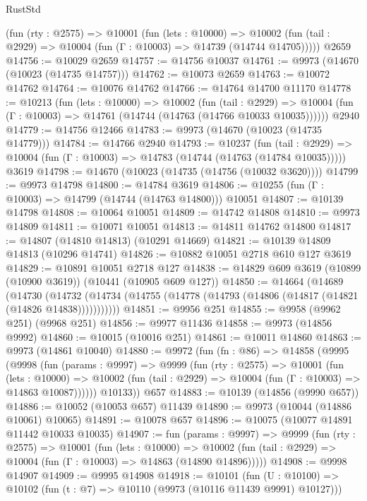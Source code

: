 \begin{lexlean}{RustStd}
\begin{coremodule}
    (fun (rty : @2575) =>
    @10001
      (fun (lets : @10000) =>
      @10002 (fun (tail : @2929) => @10004 (fun (Γ : @10003) => @14739 (@14744 @14705)))))
    @2659
@14756 := @10029 @2659
@14757 := @14756 @10037
@14761 := @9973 (@14670 (@10023 (@14735 @14757)))
@14762 := @10073 @2659
@14763 := @10072 @14762
@14764 := @10076 @14762
@14766 := @14764 @14700 @11170
@14778 := @10213
    (fun (lets : @10000) =>
    @10002
      (fun (tail : @2929) =>
      @10004 (fun (Γ : @10003) => @14761 (@14744 (@14763 (@14766 @10033 @10035))))))
    @2940
@14779 := @14756 @12466
@14783 := @9973 (@14670 (@10023 (@14735 @14779)))
@14784 := @14766 @2940
@14793 := @10237
    (fun (tail : @2929) => @10004 (fun (Γ : @10003) => @14783 (@14744 (@14763 (@14784 @10035)))))
    @3619
@14798 := @14670 (@10023 (@14735 (@14756 (@10032 @3620))))
@14799 := @9973 @14798
@14800 := @14784 @3619
@14806 := @10255 (fun (Γ : @10003) => @14799 (@14744 (@14763 @14800))) @10051
@14807 := @10139 @14798
@14808 := @10064 @10051
@14809 := @14742 @14808
@14810 := @9973 @14809
@14811 := @10071 @10051
@14813 := @14811 @14762 @14800
@14817 := @14807 (@14810 @14813) (@10291 @14669)
@14821 := @10139 @14809 @14813 (@10296 @14741)
@14826 := @10882 @10051 @2718 @610 @127 @3619
@14829 := @10891 @10051 @2718 @127
@14838 := @14829 @609 @3619 (@10899 (@10900 @3619)) (@10441 (@10905 @609 @127))
@14850 := @14664
    (@14689
      (@14730
        (@14732 (@14734 (@14755 (@14778 (@14793 (@14806 (@14817 (@14821 (@14826 @14838)))))))))))
@14851 := @9956 @251
@14855 := @9958 (@9962 @251) (@9968 @251)
@14856 := @9977 @11436
@14858 := @9973 (@14856 @9992)
@14860 := @10015 (@10016 @251)
@14861 := @10011 @14860
@14863 := @9973 (@14861 @10040)
@14880 := @9972
    (fun (fn : @86) =>
    @14858
      (@9995
        (@9998
          (fun (params : @9997) =>
          @9999
            (fun (rty : @2575) =>
            @10001
              (fun (lets : @10000) =>
              @10002 (fun (tail : @2929) => @10004 (fun (Γ : @10003) => @14863 @10087))))))
        @10133))
    @657
@14883 := @10139 (@14856 (@9990 @657))
@14886 := @10052 (@10053 @657) @11439
@14890 := @9973 (@10044 (@14886 @10061) @10065)
@14891 := @10078 @657
@14896 := @10075 (@10077 @14891 @11442 @10033 @10035)
@14907 := fun (params : @9997) =>
  @9999
    (fun (rty : @2575) =>
    @10001
      (fun (lets : @10000) =>
      @10002 (fun (tail : @2929) => @10004 (fun (Γ : @10003) => @14863 (@14890 @14896)))))
@14908 := @9998 @14907
@14909 := @9995 @14908
@14918 := @10101
    (fun (U : @10100) => @10102 (fun (t : @7) => @10110 (@9973 (@10116 @11439 @9991) @10127)))

\end{coremodule}
\end{lexlean}
